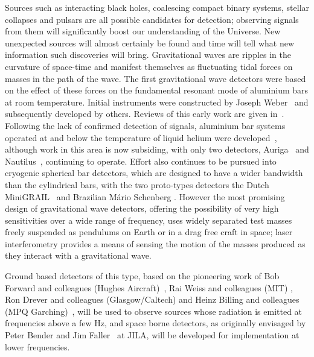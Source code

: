 \documentclass{article}
\begin{document}
Sources such as interacting black holes, coalescing compact binary systems,
stellar collapses and pulsars are all possible candidates for detection;
observing signals from them will significantly boost our understanding of the
Universe. New unexpected sources will almost certainly be found and time will
tell what new information such discoveries will bring. Gravitational waves are
ripples in the curvature of space-time and manifest themselves as fluctuating
tidal forces on masses in the path of the wave. The first gravitational wave
detectors were based on the effect of these forces on the fundamental resonant
mode of aluminium bars at room temperature. Initial instruments were constructed
by Joseph Weber~\cite{Weber1, Weber2} and subsequently developed by others.
Reviews of this early work are given in~\cite{Tyson, Douglass}. Following the
lack of confirmed detection of signals, aluminium bar systems operated at and
below the temperature of liquid helium were developed~\cite{Astone, Prodi,
Amaldi, Heng},
although work in this area is now subsiding, with only two detectors, 
Auriga~\cite{AURIGA} and Nautilus~\cite{NAUTILUS}, continuing to operate. Effort
also continues to be pursued into cryogenic spherical bar detectors, which are
designed to have a wider bandwidth than the cylindrical bars, with the two
proto-types detectors the Dutch MiniGRAIL~\cite{MiniGRAIL, Gottardi:2007} and
Brazilian M\'{a}rio Schenberg \cite{Schenberg, Aguiar:2006}. However the most
promising design of gravitational wave detectors, offering the possibility of
very high sensitivities over a wide range of frequency, uses widely separated
test masses freely suspended as pendulums on Earth or in a drag free craft in
space; laser interferometry provides a means of sensing the motion of the masses
produced as they interact with a gravitational wave.

Ground based detectors of this type, based on the pioneering work of Bob Forward
and colleagues (Hughes Aircraft)~\cite{Forward}, Rai Weiss and colleagues (MIT)
\cite{Weiss}, Ron Drever and colleagues (Glasgow/Caltech) \cite{Drever1,
Drever2} and Heinz Billing and colleagues (MPQ Garching)~\cite{Billing}, will be
used to observe sources whose radiation is emitted at frequencies above a few
Hz, and space borne detectors, as originally envisaged by Peter Bender and Jim
Faller~\cite{BenderFaller1, BenderFaller2} at JILA, will be developed for
implementation at lower frequencies.
\end{document}

